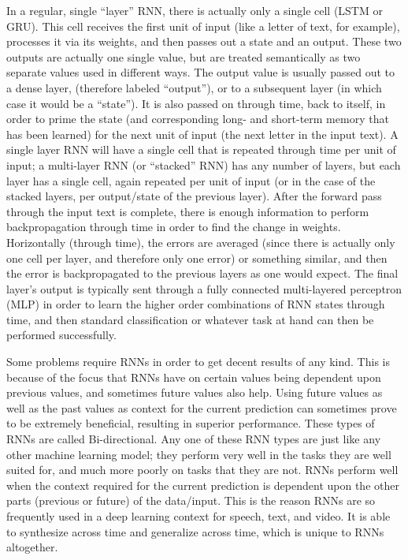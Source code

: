 \documentclass[letterpaper]{article}
\begin{document}
    In a regular, single ``layer'' RNN, there is actually only a single cell (LSTM or GRU). This cell receives the first
    unit of input (like a letter of text, for example), processes it via its weights, and then passes out a state and an
    output. These two outputs are actually one single value, but are treated semantically as two separate values used in
    different ways. The output value is usually passed out to a dense layer, (therefore labeled ``output''), or to
    a subsequent layer (in which case it would be a ``state''). It is also passed on through time, back to itself, in
    order to prime the state (and corresponding long- and short-term memory that has been learned) for the next unit of
    input (the next letter in the input text). A single layer RNN will have a single cell that is repeated through time
    per unit of input; a multi-layer RNN (or ``stacked'' RNN) has any number of layers, but each layer has a single
    cell, again repeated per unit of input (or in the case of the stacked layers, per output/state of the previous
    layer). After the forward pass through the input text is complete, there is enough information to perform
    backpropagation through time in order to find the change in weights. Horizontally (through time), the errors are
    averaged (since there is actually only one cell per layer, and therefore only one error) or something similar, and
    then the error is backpropagated to the previous layers as one would expect. The final layer's output is typically
    sent through a fully connected multi-layered perceptron (MLP) in order to learn the higher order combinations of
    RNN states through time, and then standard classification or whatever task at hand can then be performed
    successfully.

    Some problems require RNNs in order to get decent results of any kind. This is because of the focus that RNNs have
    on certain values being dependent upon previous values, and sometimes future values also help. Using future values
    as well as the past values as context for the current prediction can sometimes prove to be extremely beneficial,
    resulting in superior performance. These types of RNNs are called Bi-directional. Any one of these RNN types are
    just like any other machine learning model; they perform very well in the tasks they are well suited for, and much
    more poorly on tasks that they are not. RNNs perform well when the context required for the current prediction is
    dependent upon the other parts (previous or future) of the data/input. This is the reason RNNs are so frequently
    used in a deep learning context for speech, text, and video. It is able to synthesize across time and generalize
    across time, which is unique to RNNs altogether.
\end{document}
